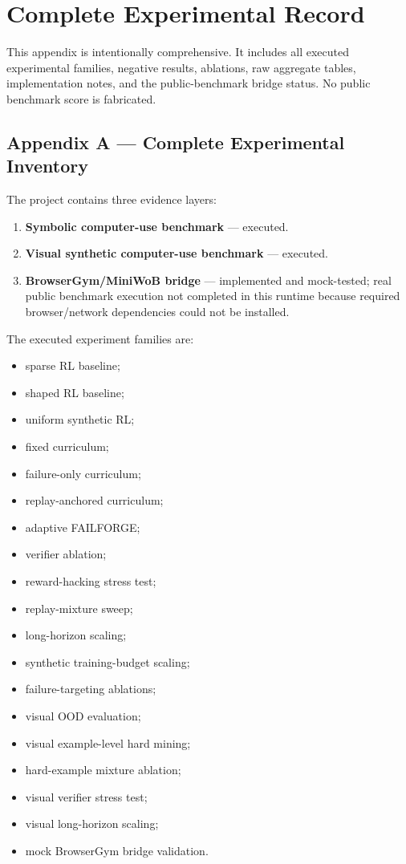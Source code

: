 \documentclass[
]{article}
\providecommand{\tightlist}{%
  \setlength{\itemsep}{0pt}\setlength{\parskip}{0pt}}
\begin{document}
\appendix
\section{Complete Experimental Record}\label{appendix}

This appendix is intentionally comprehensive. It includes all executed
experimental families, negative results, ablations, raw aggregate
tables, implementation notes, and the public-benchmark bridge status. No
public benchmark score is fabricated.

\subsection{Appendix A --- Complete Experimental
Inventory}\label{appendix-a-complete-experimental-inventory}

The project contains three evidence layers:

\begin{enumerate}
\def\labelenumi{\arabic{enumi}.}
\tightlist
\item
  \textbf{Symbolic computer-use benchmark} --- executed.
\item
  \textbf{Visual synthetic computer-use benchmark} --- executed.
\item
  \textbf{BrowserGym/MiniWoB bridge} --- implemented and mock-tested;
  real public benchmark execution not completed in this runtime because
  required browser/network dependencies could not be installed.
\end{enumerate}

The executed experiment families are:

\begin{itemize}
\tightlist
\item
  sparse RL baseline;
\item
  shaped RL baseline;
\item
  uniform synthetic RL;
\item
  fixed curriculum;
\item
  failure-only curriculum;
\item
  replay-anchored curriculum;
\item
  adaptive FAILFORGE;
\item
  verifier ablation;
\item
  reward-hacking stress test;
\item
  replay-mixture sweep;
\item
  long-horizon scaling;
\item
  synthetic training-budget scaling;
\item
  failure-targeting ablations;
\item
  visual OOD evaluation;
\item
  visual example-level hard mining;
\item
  hard-example mixture ablation;
\item
  visual verifier stress test;
\item
  visual long-horizon scaling;
\item
  mock BrowserGym bridge validation.
\end{itemize}
\end{document}
